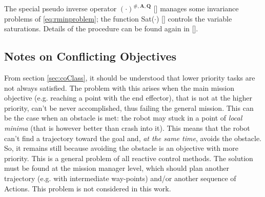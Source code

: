 \noindent The special pseudo inverse operator $\boldsymbol{(\cdot)}^{\#,\boldsymbol{A},\boldsymbol{Q}}$ [\cite{IntroMaris1}] manages some invariance problems of \eqref{eq:rminproblem}; the function Sat($\cdot$) [\cite{antoSat}] controls the variable saturations. Details of the procedure can be found again in [\cite{IntroMaris1}].

\subsection{Notes on Conflicting Objectives}
From section \ref{sec:coClass}, it should be understood that lower priority tasks are not always satisfied. The problem with this arises when the main mission objective (e.g. reaching a point with the end effector), that is not at the higher priority, can't be never accomplished, thus failing the general mission. This can be the case when an obstacle is met: the robot may stuck in a point of \textit{local minima} (that is however better than crash into it). This means that the robot can't find a trajectory toward the goal and, \textit{at the same time}, avoids the obstacle. So, it remains still because avoiding the obstacle is an objective with more priority. This is a general problem of all reactive control methods. The solution must be found at the mission manager level, which should plan another trajectory (e.g. with intermediate way-points) and/or another sequence of Actions. This problem is not considered in this work. 



